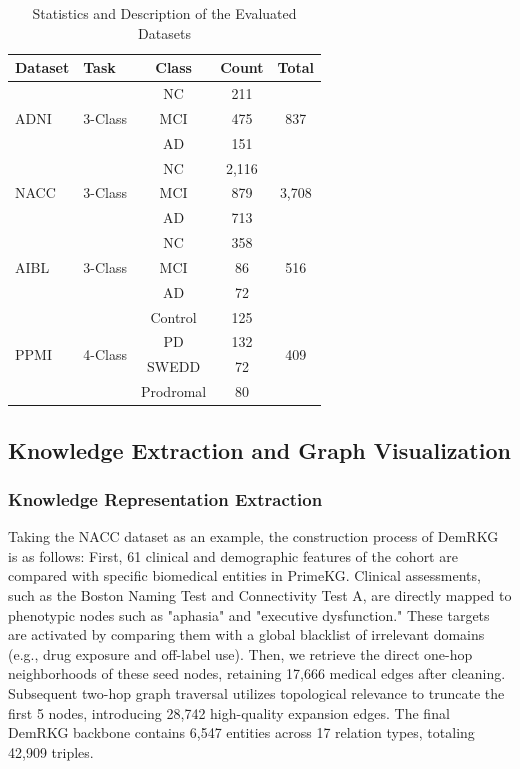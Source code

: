 \documentclass[lettersize,journal]{IEEEtran}
\begin{document}
\begin{table}[htbp]
    \centering
    \caption{Statistics and Description of the Evaluated Datasets}
    \label{tab:dataset_statistics}
    \begin{tabular}{llccc}
        \toprule
        \textbf{Dataset} & \textbf{Task} & \textbf{Class} & \textbf{Count} & \textbf{Total} \\
        \midrule
        \multirow{3}{*}{ADNI} & \multirow{3}{*}{3-Class} & NC & 211 & \multirow{3}{*}{837} \\
        & & MCI & 475 & \\
        & & AD & 151 & \\
        \midrule
        \multirow{3}{*}{NACC} & \multirow{3}{*}{3-Class} & NC & 2,116 & \multirow{3}{*}{3,708} \\
        & & MCI & 879 & \\
        & & AD & 713 & \\
        \midrule
        \multirow{3}{*}{AIBL} & \multirow{3}{*}{3-Class} & NC & 358 & \multirow{3}{*}{516} \\
        & & MCI & 86 & \\
        & & AD & 72 & \\
        \midrule
        \multirow{4}{*}{PPMI} & \multirow{4}{*}{4-Class} & Control & 125 & \multirow{4}{*}{409} \\
        & & PD & 132 & \\
        & & SWEDD & 72 & \\
        & & Prodromal & 80 & \\
        \bottomrule
    \end{tabular}
\end{table}

\subsection{Knowledge Extraction and Graph Visualization}
\subsubsection{Knowledge Representation Extraction}

Taking the NACC dataset as an example, the construction process of DemRKG is as follows: First, 61 clinical and demographic features of the cohort are compared with specific biomedical entities in PrimeKG. Clinical assessments, such as the Boston Naming Test and Connectivity Test A, are directly mapped to phenotypic nodes such as "aphasia" and "executive dysfunction." These targets are activated by comparing them with a global blacklist of irrelevant domains (e.g., drug exposure and off-label use). Then, we retrieve the direct one-hop neighborhoods of these seed nodes, retaining 17,666 medical edges after cleaning. Subsequent two-hop graph traversal utilizes topological relevance to truncate the first 5 nodes, introducing 28,742 high-quality expansion edges. The final DemRKG backbone contains 6,547 entities across 17 relation types, totaling 42,909 triples.
\end{document}
